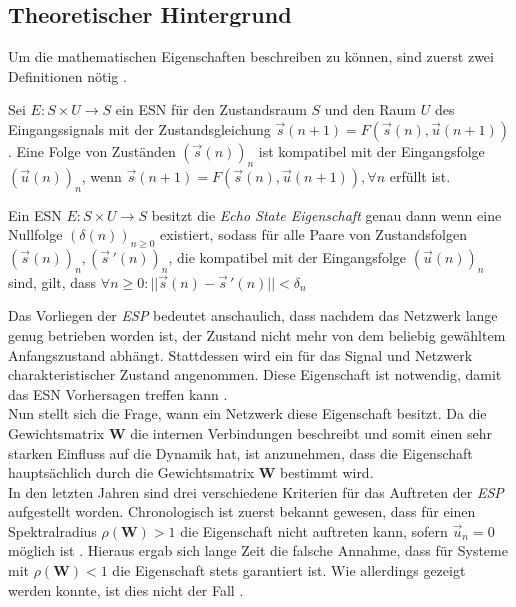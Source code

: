 \subsection{Theoretischer Hintergrund}
\label{sc:esn_theory}
Um die mathematischen Eigenschaften beschreiben zu können, sind zuerst zwei Definitionen nötig \cite{yildiz}.

\begin{definition}
Sei $E : S \times U \rightarrow S$ ein \textsc{ESN} für den Zustandsraum $S$ und den Raum $U$ des Eingangssignals mit der Zustandsgleichung $\vec{s}(n+1) = F \left( \vec{s}(n), \vec{u}(n+1) \right)$. Eine Folge von Zuständen $(\vec{s}(n))_n$ ist kompatibel mit der Eingangsfolge $(\vec{u}(n))_n$, wenn $\vec{s}(n+1) = F\left( \vec{s}(n), \vec{u}(n+1) \right), \forall n$ erfüllt ist.
\end{definition}

\begin{definition}
Ein \textsc{ESN} $E : S \times U \rightarrow S$ besitzt die \textit{Echo State Eigenschaft} genau dann wenn eine Nullfolge $(\delta(n))_{n \geq 0}$ existiert, sodass für alle Paare von Zustandsfolgen $(\vec{s}(n))_n, (\vec{s}\,'(n))_n$, die kompatibel mit der Eingangsfolge $(\vec{u}(n))_n$ sind, gilt, dass $\forall n \geq 0 : ||\vec{s}(n) - \vec{s}\,'(n)|| < \delta_n$
\end{definition} 
Das Vorliegen der \textit{ESP} bedeutet anschaulich, dass nachdem das Netzwerk lange genug betrieben worden ist, der Zustand nicht mehr von dem beliebig gewähltem Anfangszustand abhängt. Stattdessen wird ein für das Signal und Netzwerk charakteristischer Zustand angenommen. Diese Eigenschaft ist notwendig, damit das \textsc{ESN} Vorhersagen treffen kann \cite{jeagerTut2002}.\\

Nun stellt sich die Frage, wann ein Netzwerk diese Eigenschaft besitzt. Da die Gewichtsmatrix $\mathbf{W}$ die internen Verbindungen beschreibt und somit einen sehr starken Einfluss auf die Dynamik hat, ist anzunehmen, dass die Eigenschaft hauptsächlich durch die Gewichtsmatrix $\mathbf{W}$ bestimmt wird.\\

In den letzten Jahren sind drei verschiedene Kriterien für das Auftreten der \textit{ESP} aufgestellt worden. Chronologisch ist zuerst bekannt gewesen, dass für einen Spektralradius $\rho(\mathbf{W}) > 1$ die Eigenschaft nicht auftreten kann, sofern $\vec{u}_n = 0$ möglich ist \cite{jaeger2007, jaeger2010}. Hieraus ergab sich lange Zeit die falsche Annahme, dass für Systeme mit $\rho(\mathbf{W}) < 1$ die Eigenschaft stets garantiert ist. Wie allerdings gezeigt werden konnte, ist dies nicht der Fall \citep{yildiz}.\\

